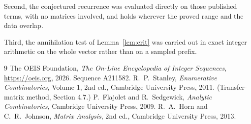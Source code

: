 \documentclass[11pt,a4paper]{article}
\theoremstyle{plain}
\theoremstyle{definition}
\begin{document}
Second, the conjectured recurrence was evaluated directly on those published terms, with no
matrices involved, and holds wherever the proved range and the data overlap.

Third, the annihilation test of Lemma~\ref{lem:crit} was carried out in exact integer
arithmetic on the whole vector rather than on a sampled prefix.

\begin{thebibliography}{9}
 The OEIS Foundation, \emph{The On-Line Encyclopedia of Integer
Sequences}, \url{https://oeis.org}, 2026. Sequence A211582.
 R.~P.~Stanley, \emph{Enumerative Combinatorics}, Volume 1, 2nd ed.,
Cambridge University Press, 2011. (Transfer-matrix method, Section 4.7.)
 P.~Flajolet and R.~Sedgewick, \emph{Analytic Combinatorics}, Cambridge
University Press, 2009.
 R.~A.~Horn and C.~R.~Johnson, \emph{Matrix Analysis}, 2nd ed., Cambridge
University Press, 2013.
\end{thebibliography}
\end{document}
